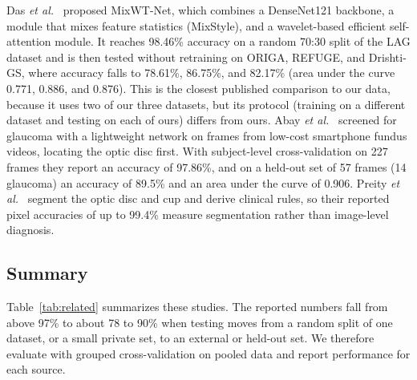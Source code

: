 Das \emph{et al.}\ \cite{das2026} proposed MixWT-Net, which combines a DenseNet121 backbone, a module that mixes feature statistics (MixStyle), and a wavelet-based efficient self-attention module. It reaches 98.46\% accuracy on a random 70:30 split of the LAG dataset and is then tested without retraining on ORIGA, REFUGE, and Drishti-GS, where accuracy falls to 78.61\%, 86.75\%, and 82.17\% (area under the curve 0.771, 0.886, and 0.876). This is the closest published comparison to our data, because it uses two of our three datasets, but its protocol (training on a different dataset and testing on each of ours) differs from ours. Abay \emph{et al.}\ \cite{abay2026} screened for glaucoma with a lightweight network on frames from low-cost smartphone fundus videos, locating the optic disc first. With subject-level cross-validation on 227 frames they report an accuracy of 97.86\%, and on a held-out set of 57 frames (14 glaucoma) an accuracy of 89.5\% and an area under the curve of 0.906. Preity \emph{et al.}\ \cite{preity2026} segment the optic disc and cup and derive clinical rules, so their reported pixel accuracies of up to 99.4\% measure segmentation rather than image-level diagnosis.

\subsection{Summary}
Table~\ref{tab:related} summarizes these studies. The reported numbers fall from above 97\% to about 78 to 90\% when testing moves from a random split of one dataset, or a small private set, to an external or held-out set. We therefore evaluate with grouped cross-validation on pooled data and report performance for each source.

